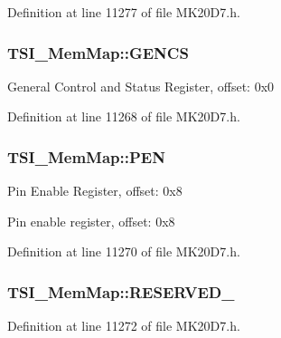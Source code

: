 Definition at line 11277 of file M\+K20\+D7.\+h.

\subsubsection[{\texorpdfstring{G\+E\+N\+CS}{GENCS}}]{ T\+S\+I\+\_\+\+Mem\+Map\+::\+G\+E\+N\+CS}\hypertarget{struct_t_s_i___mem_map_a14380d508e161af3b794962e7c3f8abb}{}\label{struct_t_s_i___mem_map_a14380d508e161af3b794962e7c3f8abb}
General Control and Status Register, offset\+: 0x0 

Definition at line 11268 of file M\+K20\+D7.\+h.

\subsubsection[{\texorpdfstring{P\+EN}{PEN}}]{ T\+S\+I\+\_\+\+Mem\+Map\+::\+P\+EN}\hypertarget{struct_t_s_i___mem_map_a37c8a06461ca09948d6a65a1289bccd9}{}\label{struct_t_s_i___mem_map_a37c8a06461ca09948d6a65a1289bccd9}
Pin Enable Register, offset\+: 0x8

Pin enable register, offset\+: 0x8 

Definition at line 11270 of file M\+K20\+D7.\+h.

\subsubsection[{\texorpdfstring{R\+E\+S\+E\+R\+V\+E\+D\+\_\+0}{RESERVED_0}}]{ T\+S\+I\+\_\+\+Mem\+Map\+::\+R\+E\+S\+E\+R\+V\+E\+D\+\_}\hypertarget{struct_t_s_i___mem_map_aecb4b24359c2124c89ec5472befbad8d}{}\label{struct_t_s_i___mem_map_aecb4b24359c2124c89ec5472befbad8d}


Definition at line 11272 of file M\+K20\+D7.\+h.

